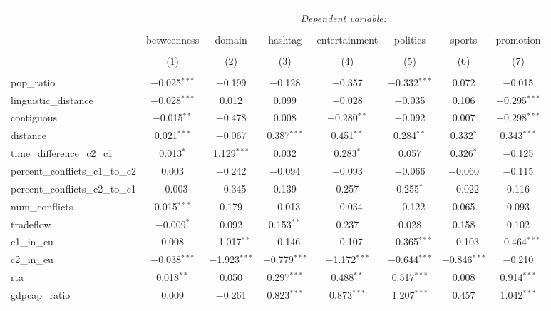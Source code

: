 
\begin{table}[!htbp] \centering 
  \caption{} 
  \label{} 
\begin{tabular}{@{\extracolsep{5pt}}lccccccc} 
\\[-1.8ex]\hline 
\hline \\[-1.8ex] 
 & \multicolumn{7}{c}{\textit{Dependent variable:}} \\ 
\cline{2-8} 
\\[-1.8ex] & betweenness & domain & hashtag & entertainment & politics & sports & promotion \\ 
\\[-1.8ex] & (1) & (2) & (3) & (4) & (5) & (6) & (7)\\ 
\hline \\[-1.8ex] 
 pop\_ratio & $-$0.025$^{***}$ & $-$0.199 & $-$0.128 & $-$0.357 & $-$0.332$^{***}$ & 0.072 & $-$0.015 \\ 
  linguistic\_distance & $-$0.028$^{***}$ & 0.012 & 0.099 & $-$0.028 & $-$0.035 & 0.106 & $-$0.295$^{***}$ \\ 
  contiguous & $-$0.015$^{**}$ & $-$0.478 & 0.008 & $-$0.280$^{**}$ & $-$0.092 & 0.007 & $-$0.298$^{***}$ \\ 
  distance & 0.021$^{***}$ & $-$0.067 & 0.387$^{***}$ & 0.451$^{**}$ & 0.284$^{**}$ & 0.332$^{*}$ & 0.343$^{***}$ \\ 
  time\_difference\_c2\_c1 & 0.013$^{*}$ & 1.129$^{***}$ & 0.032 & 0.283$^{*}$ & 0.057 & 0.326$^{*}$ & $-$0.125 \\ 
  percent\_conflicts\_c1\_to\_c2 & 0.003 & $-$0.242 & $-$0.094 & $-$0.093 & $-$0.066 & $-$0.060 & $-$0.115 \\ 
  percent\_conflicts\_c2\_to\_c1 & $-$0.003 & $-$0.345 & 0.139 & 0.257 & 0.255$^{*}$ & $-$0.022 & 0.116 \\ 
  num\_conflicts & 0.015$^{***}$ & 0.179 & $-$0.013 & $-$0.034 & $-$0.122 & 0.065 & 0.093 \\ 
  tradeflow & $-$0.009$^{*}$ & 0.092 & 0.153$^{**}$ & 0.237 & 0.028 & 0.158 & 0.102 \\ 
  c1\_in\_eu & 0.008 & $-$1.017$^{**}$ & $-$0.146 & $-$0.107 & $-$0.365$^{***}$ & $-$0.103 & $-$0.464$^{***}$ \\ 
  c2\_in\_eu & $-$0.038$^{***}$ & $-$1.923$^{***}$ & $-$0.779$^{***}$ & $-$1.172$^{***}$ & $-$0.644$^{***}$ & $-$0.846$^{***}$ & $-$0.210 \\ 
  rta & 0.018$^{**}$ & 0.050 & 0.297$^{***}$ & 0.488$^{**}$ & 0.517$^{***}$ & 0.008 & 0.914$^{***}$ \\ 
  gdpcap\_ratio & 0.009 & $-$0.261 & 0.823$^{***}$ & 0.873$^{***}$ & 1.207$^{***}$ & 0.457 & 1.042$^{***}$ \\ 

\end{tabular}
\end{table}
